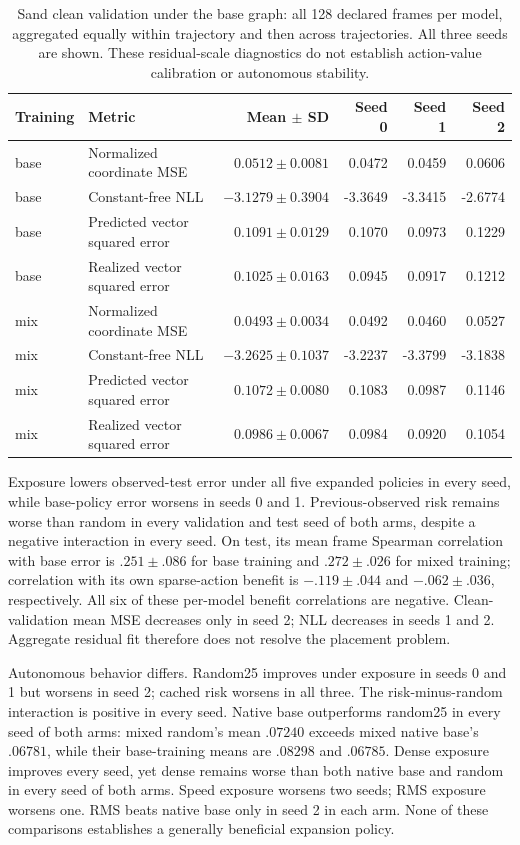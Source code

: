 \begin{table}[t]
\centering\scriptsize
\caption{Sand clean validation under the base graph: all 128 declared frames per model, aggregated equally within trajectory and then across trajectories. All three seeds are shown. These residual-scale diagnostics do not establish action-value calibration or autonomous stability.}
\label{tab:sand-clean}
\setlength{\tabcolsep}{3pt}
\begin{tabular}{llrrrr}
\toprule
Training & Metric & Mean $\pm$ SD & Seed 0 & Seed 1 & Seed 2\\
\midrule
base & Normalized coordinate MSE & $0.0512\pm0.0081$ & 0.0472 & 0.0459 & 0.0606\\
base & Constant-free NLL & $-3.1279\pm0.3904$ & -3.3649 & -3.3415 & -2.6774\\
base & Predicted vector squared error & $0.1091\pm0.0129$ & 0.1070 & 0.0973 & 0.1229\\
base & Realized vector squared error & $0.1025\pm0.0163$ & 0.0945 & 0.0917 & 0.1212\\
mix & Normalized coordinate MSE & $0.0493\pm0.0034$ & 0.0492 & 0.0460 & 0.0527\\
mix & Constant-free NLL & $-3.2625\pm0.1037$ & -3.2237 & -3.3799 & -3.1838\\
mix & Predicted vector squared error & $0.1072\pm0.0080$ & 0.1083 & 0.0987 & 0.1146\\
mix & Realized vector squared error & $0.0986\pm0.0067$ & 0.0984 & 0.0920 & 0.1054\\
\bottomrule
\end{tabular}
\end{table}

Exposure lowers observed-test error under all five expanded policies in every seed, while base-policy error worsens in seeds 0 and 1. Previous-observed risk remains worse than random in every validation and test seed of both arms, despite a negative interaction in every seed. On test, its mean frame Spearman correlation with base error is $.251\pm.086$ for base training and $.272\pm.026$ for mixed training; correlation with its own sparse-action benefit is $-.119\pm.044$ and $-.062\pm.036$, respectively. All six of these per-model benefit correlations are negative. Clean-validation mean MSE decreases only in seed 2; NLL decreases in seeds 1 and 2. Aggregate residual fit therefore does not resolve the placement problem.

Autonomous behavior differs. Random25 improves under exposure in seeds 0 and 1 but worsens in seed 2; cached risk worsens in all three. The risk-minus-random interaction is positive in every seed. Native base outperforms random25 in every seed of both arms: mixed random's mean $.07240$ exceeds mixed native base's $.06781$, while their base-training means are $.08298$ and $.06785$. Dense exposure improves every seed, yet dense remains worse than both native base and random in every seed of both arms. Speed exposure worsens two seeds; RMS exposure worsens one. RMS beats native base only in seed 2 in each arm. None of these comparisons establishes a generally beneficial expansion policy.

